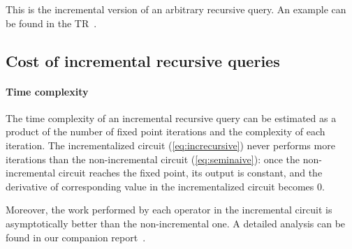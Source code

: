 \vspace{1mm}
This is the incremental version of an arbitrary recursive query.  An example can be found in the TR~\cite{tr}.


\subsection{Cost of incremental recursive queries}

\paragraph{Time complexity}

The time complexity of an incremental recursive query can be estimated as a product of
the number of fixed point iterations and the complexity of each iteration. The
incrementalized circuit (\ref{eq:increcursive}) never performs more
iterations than the non-incremental circuit (\ref{eq:seminaive}):
once the non-incremental circuit reaches the fixed point, its output is constant, 
and the derivative of corresponding value in the incrementalized circuit becomes 0.

Moreover, the work performed by each operator in the incremental 
circuit is asymptotically better than the non-incremental one.
A detailed analysis can be found in our companion report~\cite{tr}.



